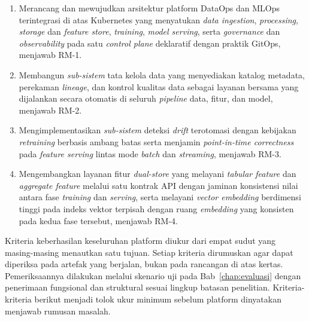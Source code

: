 \vspace{0.5em}
\begin{enumerate}
    \item Merancang dan mewujudkan arsitektur platform DataOps dan MLOps terintegrasi di atas Kubernetes yang menyatukan \textit{data ingestion}, \textit{processing}, \textit{storage} dan \textit{feature store}, \textit{training}, \textit{model serving}, serta \textit{governance} dan \textit{observability} pada satu \textit{control plane} deklaratif dengan praktik GitOps, menjawab RM-1.

    \item Membangun \textit{sub-sistem} tata kelola data yang menyediakan katalog metadata, perekaman \textit{lineage}, dan kontrol kualitas data sebagai layanan bersama yang dijalankan secara otomatis di seluruh \textit{pipeline} data, fitur, dan model, menjawab RM-2.

    \item Mengimplementasikan \textit{sub-sistem} deteksi \textit{drift} terotomasi dengan kebijakan \textit{retraining} berbasis ambang batas serta menjamin \textit{point-in-time correctness} pada \textit{feature serving} lintas mode \textit{batch} dan \textit{streaming}, menjawab RM-3.

    \item Mengembangkan layanan fitur \textit{dual-store} yang melayani \textit{tabular feature} dan \textit{aggregate feature} melalui satu kontrak API dengan jaminan konsistensi nilai antara fase \textit{training} dan \textit{serving}, serta melayani \textit{vector embedding} berdimensi tinggi pada indeks vektor terpisah dengan ruang \textit{embedding} yang konsisten pada kedua fase tersebut, menjawab RM-4.
\end{enumerate}

Kriteria keberhasilan keseluruhan platform diukur dari empat sudut yang masing-masing menautkan satu tujuan. Setiap kriteria dirumuskan agar dapat diperiksa pada artefak yang berjalan, bukan pada rancangan di atas kertas. Pemeriksaannya dilakukan melalui skenario uji pada Bab~\ref{chap:evaluasi} dengan penerimaan fungsional dan struktural sesuai lingkup batasan penelitian. Kriteria-kriteria berikut menjadi tolok ukur minimum sebelum platform dinyatakan menjawab rumusan masalah.

